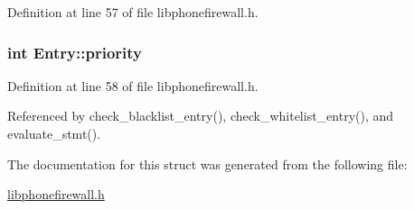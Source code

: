 Definition at line 57 of file libphonefirewall.h.\hypertarget{structEntry_85af261b3171c257892b54a7200da061}{
\subsubsection{\setlength{\rightskip}{0pt plus 5cm}int {\bf Entry::priority}}}
\label{structEntry_85af261b3171c257892b54a7200da061}




Definition at line 58 of file libphonefirewall.h.

Referenced by check\_\-blacklist\_\-entry(), check\_\-whitelist\_\-entry(), and evaluate\_\-stmt().

The documentation for this struct was generated from the following file:\begin{CompactItemize}
\item 
\hyperlink{libphonefirewall_8h}{libphonefirewall.h}\end{CompactItemize}
